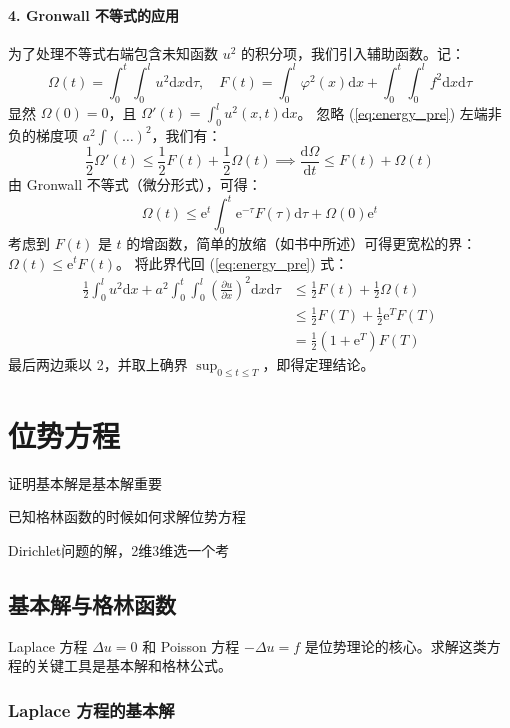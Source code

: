 \documentclass[12pt,a4paper]{ctexart}
\begin{document}
	\paragraph{4. Gronwall 不等式的应用}
	为了处理不等式右端包含未知函数 $u^2$ 的积分项，我们引入辅助函数。记：
	\[
	\Omega(t) = \int_0^t \int_0^l u^2 \mathrm{d}x \mathrm{d}\tau, \quad F(t) = \int_0^l \varphi^2(x) \mathrm{d}x + \int_0^t \int_0^l f^2 \mathrm{d}x \mathrm{d}\tau
	\]
	显然 $\Omega(0)=0$，且 $\Omega'(t) = \int_0^l u^2(x,t) \mathrm{d}x$。
	忽略 (\ref{eq:energy_pre}) 左端非负的梯度项 $a^2 \int (\dots)^2$，我们有：
	\[
	\frac{1}{2} \Omega'(t) \leqslant \frac{1}{2} F(t) + \frac{1}{2} \Omega(t) \implies \frac{\mathrm{d}\Omega}{\mathrm{d}t} \leqslant F(t) + \Omega(t)
	\]
	由 Gronwall 不等式（微分形式），可得：
	\[
	\Omega(t) \leqslant \mathrm{e}^t \int_0^t \mathrm{e}^{-\tau} F(\tau) \mathrm{d}\tau + \Omega(0) \mathrm{e}^t
	\]
	考虑到 $F(t)$ 是 $t$ 的增函数，简单的放缩（如书中所述）可得更宽松的界：$\Omega(t) \leqslant \mathrm{e}^t F(t)$。
	将此界代回 (\ref{eq:energy_pre}) 式：
	\begin{align*}
		\frac{1}{2} \int_0^l u^2 \mathrm{d}x + a^2 \int_0^t \int_0^l \left( \frac{\partial u}{\partial x} \right)^2 \mathrm{d}x \mathrm{d}\tau 
		&\leqslant \frac{1}{2} F(t) + \frac{1}{2} \Omega(t) \\
		&\leqslant \frac{1}{2} F(T) + \frac{1}{2} \mathrm{e}^T F(T) \\
		&= \frac{1}{2} (1 + \mathrm{e}^T) F(T)
	\end{align*}
	最后两边乘以 2，并取上确界 $\sup_{0 \leqslant t \leqslant T}$，即得定理结论。
	
	\section{位势方程}
	
	证明基本解是基本解重要
	
	已知格林函数的时候如何求解位势方程
	
	Dirichlet问题的解，2维3维选一个考
	
	
	
	\subsection{基本解与格林函数}
	
	Laplace 方程 $\Delta u = 0$ 和 Poisson 方程 $-\Delta u = f$ 是位势理论的核心。求解这类方程的关键工具是基本解和格林公式。
	
	\subsubsection{Laplace 方程的基本解}
	
\end{document}
